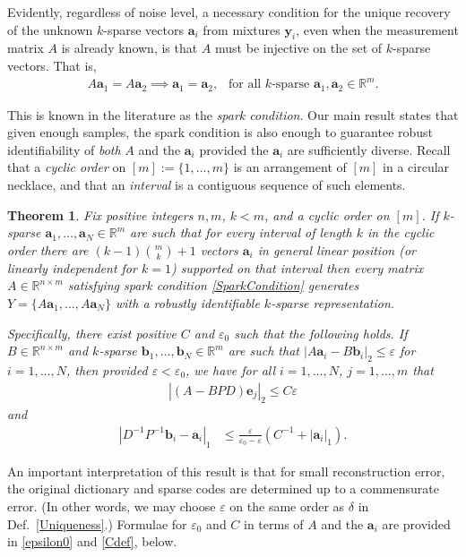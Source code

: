 \documentclass[journal, onecolumn]{IEEEtran}
\newtheorem{theorem}{Theorem}
\begin{document}
Evidently, regardless of noise level, a necessary condition for the unique recovery of the unknown $k$-sparse vectors $\mathbf{a}_i$ from mixtures $\mathbf{y}_i$, even when the measurement matrix $A$ is already known, is that $A$ must be injective on the set of $k$-sparse vectors. That is,
\begin{align}\label{SparkCondition}
A\mathbf{a}_1 = A\mathbf{a}_2 \implies \mathbf{a}_1 = \mathbf{a}_2, \ \ \text{ for all $k$-sparse } \mathbf{a}_1, \mathbf{a}_2 \in \mathbb{R}^m.
\end{align}

This is known in the literature as the \emph{spark condition}. Our main result states that given enough samples, the spark condition is also enough to guarantee robust identifiability of \emph{both} $A$ and the $\mathbf{a}_i$ provided the $\mathbf{a}_i$ are sufficiently diverse.  Recall that a \textit{cyclic order} on $[m] := \{1, \ldots,m\}$ is an arrangement of $[m]$ in a circular necklace, and that an \textit{interval} is a contiguous sequence of such elements. 

\begin{theorem}\label{DeterministicUniquenessTheorem}
Fix positive integers $n, m$, $k < m$, and a cyclic order on $[m]$. If $k$-sparse $\mathbf{a}_1, \ldots, \mathbf{a}_N \in \mathbb{R}^m$ are such that for every interval of length $k$ in the cyclic order there are $(k-1){m \choose k}+1$ vectors $\mathbf{a}_i$ in general linear position (or linearly independent for $k=1$) supported on that interval then every matrix $A \in \mathbb{R}^{n \times m}$ satisfying spark condition \eqref{SparkCondition} generates $Y = \{A\mathbf{a}_1, \ldots, A\mathbf{a}_N\}$ with a robustly identifiable $k$-sparse representation.

Specifically, there exist positive $C$ and $\varepsilon_0$ such that the following holds. If $B \in \mathbb{R}^{n \times m}$ and $k$-sparse $\mathbf{b}_1, \ldots, \mathbf{b}_N \in \mathbb{R}^m$ are such that $|A\mathbf{a}_i - B\mathbf{b}_i|_2 \leq \varepsilon$ for $i = 1, \ldots, N$, then provided $\varepsilon < \varepsilon_0$, we have for all $i = 1, \ldots, N$, $j = 1, \ldots, m$  that
\begin{align}\label{Cstable}
|(A-BPD)\mathbf{e}_j|_2 \leq C\varepsilon
\end{align}
and 
\begin{align}\label{b-PDa}
|D^{-1}P^{-1}\mathbf{b}_i - \mathbf{a}_i|_1 &\leq \frac{\varepsilon }{\varepsilon_0 - \varepsilon} \left( C^{-1}+|\mathbf{a}_i|_1 \right).
\end{align}
\end{theorem}
An important interpretation of this result is that for small reconstruction error, the original dictionary and sparse codes are determined up to a commensurate error.  (In other words, we may choose $\varepsilon$ on the same order as $\delta$ in Def.~\ref{Uniqueness}.) Formulae for $\varepsilon_0$ and $C$ in terms of $A$ and the $\mathbf{a}_i$ are provided in \eqref{epsilon0} and \eqref{Cdef}, below. 
\end{document}
